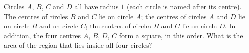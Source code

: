 Circles $A$, $B$, $C$ and $D$ all have radius $1$ (each circle is named after its centre). The centres of circles $B$ and $C$ lie on circle $A$; the centres of circles $A$ and $D$ lie on circle $B$ and on circle $C$; the centres of circles $B$ and $C$ lie on circle $D$. In addition, the four centres $A$, $B$, $D$, $C$ form a square, in this order. What is the area of the region that lies inside all four circles?
